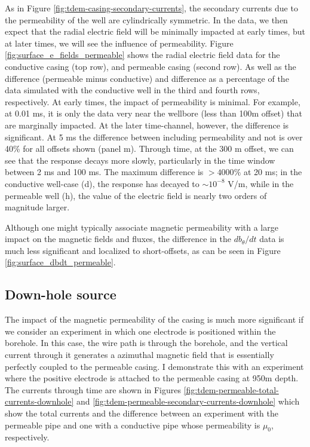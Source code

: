 As in Figure \ref{fig:tdem-casing-secondary-currents}, the secondary currents due to the permeability of the well are cylindrically symmetric. In the data, we then expect that the radial electric field will be minimally impacted at early times, but at later times, we will see the influence of permeability. Figure  \ref{fig:surface_e_fields_permeable} shows the radial electric field data for the conductive casing (top row), and permeable casing (second row). As well as the difference (permeable minus conductive) and difference as a percentage of the data simulated with the conductive well in the third and fourth rows, respectively. At early times, the impact of permeability is minimal. For example, at 0.01 ms, it is only the data very near the wellbore (less than 100m offset) that are marginally impacted. At the later time-channel, however, the difference is significant. At 5 ms  the difference between including permeability and not is over 40\% for all offsets shown (panel m). Through time, at the 300 m offset, we can see that the response decays more slowly, particularly in the time window between 2 ms and 100 ms. The maximum difference is $> 4000 \%$ at 20 ms; in the conductive well-case (d), the response has decayed to $\sim 10^{-8}$ V/m, while in the permeable well (h), the value of the electric field is nearly two orders of magnitude larger.





Although one might typically associate magnetic permeability with a large impact on the magnetic fields and fluxes, the difference in the $db_{\theta}/dt$ data is much less significant and localized to short-offsets, as can be seen in Figure \ref{fig:surface_dbdt_permeable}.





\subsection{Down-hole source}
The impact of the magnetic permeability of the casing is much more significant if we consider an experiment in which one electrode is positioned within the borehole. In this case, the wire path is through the borehole, and the vertical current through it generates a azimuthal magnetic field that is essentially perfectly coupled to the permeable casing. I demonstrate this with an experiment where the positive electrode is attached to the permeable casing at 950m depth. The currents through time are shown in Figures \ref{fig:tdem-permeable-total-currents-downhole} and \ref{fig:tdem-permeable-secondary-currents-downhole} which show the total currents and the difference between an experiment with the permeable pipe and one with a conductive pipe whose permeability is $\mu_0$, respectively.

